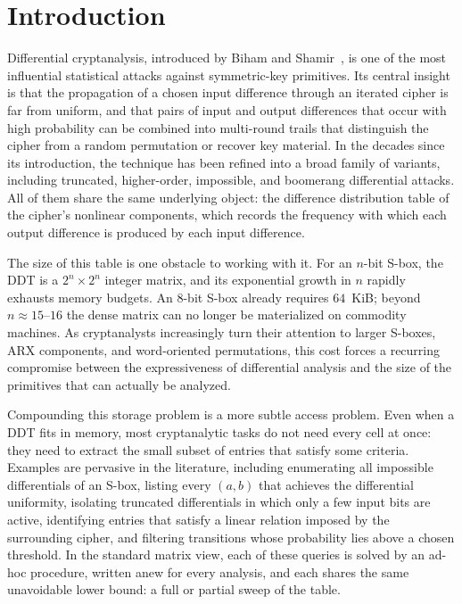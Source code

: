 \documentclass[runningheads]{llncs}
\begin{document}
\section{Introduction}

Differential cryptanalysis, introduced by Biham and Shamir~\cite{biham}, is one
of the most influential statistical attacks against symmetric-key primitives. Its
central insight is that the propagation of a chosen input difference through an
iterated cipher is far from uniform, and that pairs of input and output
differences that occur with high probability can be combined into multi-round
trails that distinguish the cipher from a random permutation or recover key
material. In the decades since its introduction, the technique has been refined
into a broad family of variants, including truncated, higher-order, impossible,
and boomerang differential attacks. All of them share the same underlying object:
the difference distribution table of the cipher's nonlinear components, which
records the frequency with which each output difference is produced by each input
difference.

The size of this table is one obstacle to working with it. For an $n$-bit S-box, the DDT
is a $2^{n}\times 2^{n}$ integer matrix, and its exponential growth in $n$ rapidly
exhausts memory budgets. An $8$-bit S-box already requires $64$~KiB; beyond
$n\approx 15$--$16$ the dense matrix can no longer be materialized on commodity
machines. As cryptanalysts increasingly turn their attention to larger S-boxes,
ARX components, and word-oriented permutations, this cost forces a recurring
compromise between the expressiveness of differential analysis and the size of
the primitives that can actually be analyzed.

Compounding this storage problem is a more subtle access problem. Even when a DDT
fits in memory, most cryptanalytic tasks do not need every cell at once: they need
to extract the small subset of entries that satisfy some criteria.
Examples are pervasive in the literature, including enumerating all impossible
differentials of an S-box, listing every $(a,b)$ that achieves the differential
uniformity, isolating truncated differentials in which only a few input bits are
active, identifying entries that satisfy a linear relation imposed by the
surrounding cipher, and filtering transitions whose probability lies above a
chosen threshold. In the standard matrix view, each of these queries is solved by
an ad-hoc procedure, written anew for every analysis, and each shares the same
unavoidable lower bound: a full or partial sweep of the table.
\end{document}
